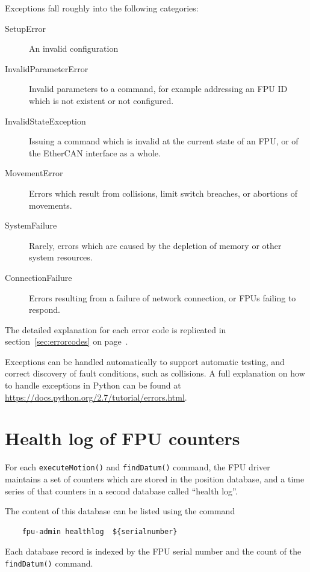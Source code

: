 \documentclass[fontsize=12,a4paper]{scrreprt}
\begin{document}
Exceptions fall roughly into the following categories:

\begin{description}
  \item[SetupError] An invalid configuration
  \item[InvalidParameterError] Invalid parameters to a command, for example addressing an FPU
    ID which is not existent or not configured.
  \item[InvalidStateException] Issuing a command which is invalid at the current state of
    an FPU, or of the EtherCAN interface as a whole.
  \item[MovementError] Errors which result from collisions, limit switch breaches,
    or abortions of movements.
  \item[SystemFailure] Rarely, errors which are caused by the depletion of memory
    or other system resources.
  \item[ConnectionFailure] Errors resulting from a failure of network connection, or FPUs failing to respond.
\end{description}

The detailed explanation for each error code is replicated in
section~\ref{sec:errorcodes} on page~\pageref{sec:errorcodes}.

Exceptions can be handled automatically to support automatic
testing, and correct discovery of fault conditions, such as
collisions. A full explanation on how to handle exceptions in Python can
be found at \url{https://docs.python.org/2.7/tutorial/errors.html}.

\chapter{Health log of FPU counters}
\label{sec:healthlog}

For each \texttt{executeMotion()} and \texttt{findDatum()} command,
the FPU driver maintains a set of counters which are stored in the
position database, and a time series of that counters in a second
database called ``health log''.

The content of this database can be listed using the command

\begin{verbatim}
    fpu-admin healthlog  ${serialnumber}
\end{verbatim}

Each database record is indexed by the FPU serial number and the count
of the \texttt{findDatum()} command.
\end{document}
